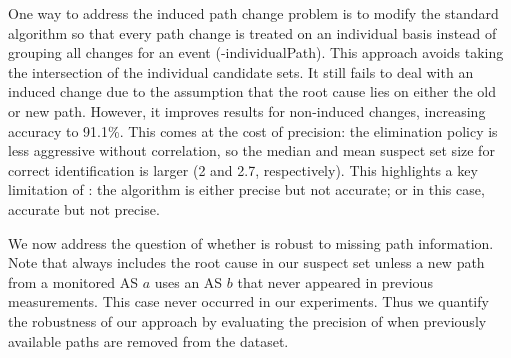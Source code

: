 One way to address the induced path change problem is to modify the standard  \feldmann algorithm 
so that every path change is treated on an individual basis instead of
grouping all changes for an event (\feldmann-individualPath). This approach
avoids taking the intersection of the individual candidate sets. It still fails to deal with an induced change due to the  
assumption that the root cause lies on either the old or new path. However, it improves results for non-induced changes, 
increasing accuracy to 91.1\%. This comes at the cost of precision: the elimination
policy is less aggressive without correlation, so the median and mean suspect set size for correct identification is larger (2 and 2.7, respectively). 
This highlights a key limitation of \feldmann: the algorithm is either precise but not accurate; or in this case, 
accurate but not precise.  



We now address the question of whether \ouralgo is robust to 
missing path information. Note 
that \ouralgo always includes the root cause in our suspect set unless a 
new path from a monitored AS $a$ uses an AS $b$ that never appeared in 
previous measurements. This case never occurred in our experiments. 
Thus we quantify the robustness of our approach by evaluating the precision of 
\ouralgo when previously available paths are removed from the dataset.

